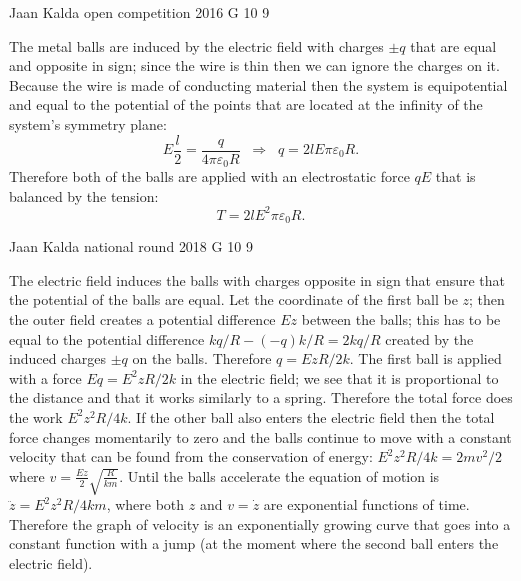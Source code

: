 \documentclass[11pt]{article}
\begin{document}
{Jaan Kalda} %
{open competition} %
{2016} %
{G 10} %
{9} %
{

\ifEngSolution
The metal balls are induced by the electric field with charges $\pm q$ that are equal and opposite in sign; since the wire is thin then we can ignore the charges on it. Because the wire is made of conducting material then the system is equipotential and equal to the potential of the points that are located at the infinity of the system’s symmetry plane:
$$E\frac l2=\frac q{4\pi\varepsilon_0R}\;\;\Rightarrow\;\; q=2lE\pi\varepsilon_0R.$$ 
Therefore both of the balls are applied with an electrostatic force $qE$ that is balanced by the tension:
$$T=2lE^2\pi\varepsilon_0R.$$
\fi
}

{Jaan Kalda} %
{national round} %
{2018} %
{G 10} %
{9} %
{

\ifEngSolution
The electric field induces the balls with charges opposite in sign that ensure that the potential of the balls are equal. Let the coordinate of the first ball be $z$; then the outer field creates a potential difference $Ez$ between the balls; this has to be equal to the potential difference $kq/R-(-q)k/R=2kq/R$ created by the induced charges $\pm q$ on the balls. Therefore $q=EzR/2k$. The first ball is applied with a force $Eq=E^2zR/2k$ in the electric field; we see that it is proportional to the distance and that it works similarly to a spring. Therefore the total force does the work $E^2z^2R/4k$. If the other ball also enters the electric field then the total force changes momentarily to zero and the balls continue to move with a constant velocity that can be found from the conservation of energy: $E^2z^2R/4k=2mv^2/2$ where $v=\frac {Ez}{2}\sqrt{\frac{R}{km}}$. Until the balls accelerate the equation of motion is $\ddot z=E^2z^2R/4km$, where both $z$ and $v=\dot z$ are exponential functions of time. Therefore the graph of velocity is an exponentially growing curve that goes into a constant function with a jump (at the moment where the second ball enters the electric field).
\fi
}
\end{document}
